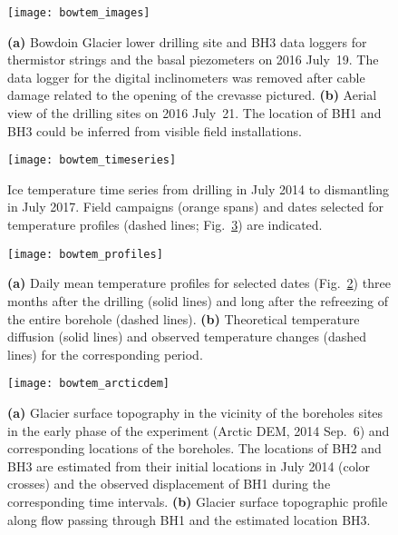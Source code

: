 \documentclass[utf8]{article}
\begin{document}
    \begin{figure}
      \centerline{\texttt{[image: bowtem\_images]}}
      \caption{%
        \textbf{(a)} Bowdoin Glacier lower drilling site and BH3 data loggers
          for thermistor strings and the basal piezometers on 2016 July~19. The
          data logger for the digital inclinometers was removed after cable
          damage related to the opening of the crevasse pictured.
        \textbf{(b)} Aerial view of the drilling sites on 2016 July~21. The
          location of BH1 and BH3 could be inferred from visible field
          installations.}
      \label{fig:images}
    \end{figure}

    \begin{figure}
      \centerline{\texttt{[image: bowtem\_timeseries]}}
      \caption{%
        Ice temperature time series from drilling in July 2014 to dismantling
        in July 2017. Field campaigns (orange spans) and dates selected for
        temperature profiles (dashed lines; Fig.~\ref{fig:profiles}) are
        indicated.}
      \label{fig:timeseries}
    \end{figure}

    \begin{figure}
      \centerline{\texttt{[image: bowtem\_profiles]}}
      \caption{%
        \textbf{(a)} Daily mean temperature profiles for selected dates
          (Fig.~\ref{fig:timeseries}) three months after the drilling (solid
          lines) and long after the refreezing of the entire borehole (dashed
          lines).
        \textbf{(b)} Theoretical temperature diffusion (solid lines) and
          observed temperature changes (dashed lines) for the corresponding
          period.}
      \label{fig:profiles}
    \end{figure}

    \begin{figure}
      \centerline{\texttt{[image: bowtem\_arcticdem]}}
      \caption{%
        \textbf{(a)} Glacier surface topography in the vicinity of the
          boreholes sites in the early phase of the experiment (Arctic DEM,
          2014 Sep.~6) and corresponding locations of the boreholes. The
          locations of BH2 and BH3 are estimated from their initial locations
          in July 2014 (color crosses) and the observed displacement of BH1
          during the corresponding time intervals.
        \textbf{(b)} Glacier surface topographic profile along flow
          passing through BH1 and the estimated location BH3.}
      \label{fig:arcticdem}
    \end{figure}
\end{document}
